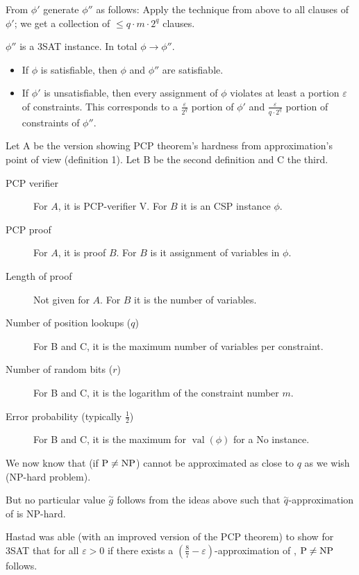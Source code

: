 \documentclass[a4paper]{article}
\newcommand{\cls}[1]{\rm{#1}}
\newcommand{\probl}[1]{\text{\textsc{#1}}}
\begin{document}
From $\phi'$ generate $\phi''$ as follows:
Apply the technique from above to all clauses of $\phi'$;
we get a collection of $\leq q\cdot m\cdot 2^q$ clauses.

$\phi''$ is a 3SAT instance. In total $\phi \rightarrow \phi''$.
\begin{itemize}
  \item If $\phi$ is satisfiable, then $\phi$ and $\phi''$ are satisfiable.
  \item If $\phi'$ is unsatisfiable, then every assignment of $\phi$
        violates at least a portion $\varepsilon$ of constraints.
        This corresponds to a $\frac{\varepsilon}{2^q}$ portion of $\phi'$
        and $\frac{\varepsilon}{q\cdot2^q}$ portion of constraints
        of $\phi''$.
\end{itemize}

Let A be the version showing PCP theorem's hardness from
approximation's point of view (definition 1). Let B be the second definition
and C the third.

\begin{description}
  \item[PCP verifier]
    For $A$, it is PCP-verifier V. For $B$ it is an CSP instance $\phi$.
  \item[PCP proof]
    For $A$, it is proof $B$. For $B$ is it assignment of variables in $\phi$.
  \item[Length of proof]
    Not given for $A$. For $B$ it is the number of variables.
  \item[Number of position lookups ($q$)]
    For B and C, it is the maximum number of variables per constraint.
  \item[Number of random bits ($r$)]
    For B and C, it is the logarithm of the constraint number $m$.
  \item[Error probability (typically $\frac12$)]
    For B and C, it is the maximum for
    $\operatorname{val}(\phi)$ for a No instance.
\end{description}

We now know that (if $\cls{P} \neq \cls{NP}$) \probl{Max-3-SAT} cannot be
approximated as close to $q$ as we wish (\cls{NP}-hard problem).

But no particular value $\stackrel{\sim}{g}$ follows from the
ideas above such that $\stackrel{\sim}{q}$-approximation of
\probl{Max-3-SAT} is \cls{NP}-hard.

Hastad was able (with an improved version of the PCP theorem) to
show for 3SAT that for all $\varepsilon > 0$ if there exists a
$(\frac87 - \varepsilon)$-approximation of \probl{Max-3-SAT}, $\cls{P}
\neq \cls{NP}$ follows.
\end{document}

